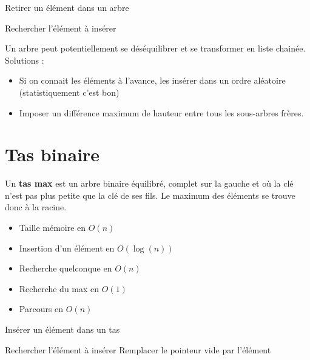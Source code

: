 \documentclass[11pt,a4paper]{report}
\begin{document}
\begin{algorithm}[H]
\caption{Retirer un élément dans un arbre}
Rechercher l'élément à insérer\;
\end{algorithm}

Un arbre peut potentiellement se déséquilibrer et se transformer en liste chainée. Solutions :
\begin{itemize}
    \item Si on connait les éléments à l'avance, les insérer dans un ordre aléatoire (statistiquement c'est bon)
    \item Imposer un différence maximum de hauteur entre tous les sous-arbres frères.
\end{itemize}

\section{Tas binaire}
Un \textbf{tas max} est un arbre binaire équilibré, complet sur la gauche et où la clé n'est pas plus petite que la clé de ses fils. Le maximum des éléments se trouve donc à la racine.

\begin{itemize}
    \item Taille mémoire en $O(n)$
    \item Insertion d'un élément en $O(\log(n))$
    \item Recherche quelconque en $O(n)$
    \item Recherche du max en $O(1)$
    \item Parcours en $O(n)$
\end{itemize}

\begin{algorithm}[H]
\caption{Insérer un élément dans un tas}
Rechercher l'élément à insérer
Remplacer le pointeur vide par l'élément\;
\end{algorithm}
\end{document}
